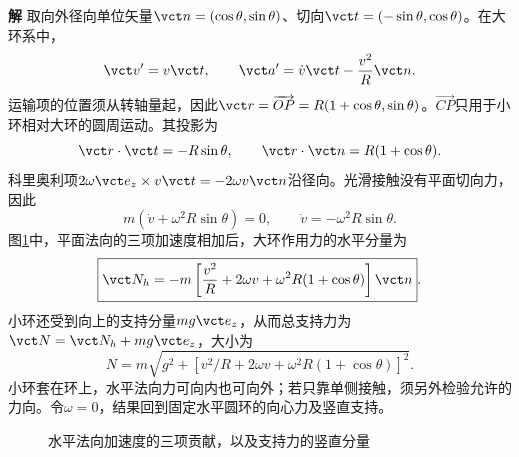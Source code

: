 \documentclass[11pt,openany,fontset=fandol]{ctexbook}
\theoremstyle{definition}\newtheorem{example}{例}[chapter]\newtheorem{exercise}{习题}[chapter]
\newcommand{\SolutionStart}{\par\medskip\ifdim\pagetotal>0pt\ifdim\dimexpr\pagegoal-\pagetotal\relax<3\baselineskip\newpage\fi\fi\noindent\textbf{解}\quad\ignorespaces}
\newenvironment{solution}{\SolutionStart}{\par\medskip}
\begin{document}
\begin{solution}
取向外径向单位矢量$\vct n=(\cos\theta,\sin\theta)$、切向$\vct t=(-\sin\theta,\cos\theta)$。在大环系中，
\[
 \vct v'=v\vct t,\qquad
 \vct a'=\dot v\vct t-\frac{v^2}{R}\vct n.
\]
运输项的位置须从转轴量起，因此$\vct r=\overrightarrow{OP}=R(1+\cos\theta,\sin\theta)$。$\overrightarrow{CP}$只用于小环相对大环的圆周运动。其投影为
\[
 \vct r\cdot\vct t=-R\sin\theta,\qquad
 \vct r\cdot\vct n=R(1+\cos\theta).
\]
科里奥利项$2\omega\vct e_z\times v\vct t=-2\omega v\vct n$沿径向。光滑接触没有平面切向力，因此
\[
 m(\dot v+\omega^2R\sin\theta)=0,
 \qquad \boxed{\dot v=-\omega^2R\sin\theta}.
\]
图\ref{mp3:fig:hw:l3-18-s}中，平面法向的三项加速度相加后，大环作用力的水平分量为
\[
 \boxed{\vct N_h=-m\left[\frac{v^2}{R}+2\omega v
                         +\omega^2R(1+\cos\theta)\right]\vct n}.
\]
小环还受到向上的支持分量$mg\vct e_z$，从而总支持力为$\vct N=\vct N_h+mg\vct e_z$，大小为
\[
 N=m\sqrt{g^2+\left[v^2/R+2\omega v+\omega^2R(1+\cos\theta)\right]^2}.
\]
小环套在环上，水平法向力可向内也可向外；若只靠单侧接触，须另外检验允许的力向。令$\omega=0$，结果回到固定水平圆环的向心力及竖直支持。


\begin{figure}[H]\centering
{}
\caption{水平法向加速度的三项贡献，以及支持力的竖直分量}\label{mp3:fig:hw:l3-18-s}
\end{figure}

\end{solution}
\end{document}
